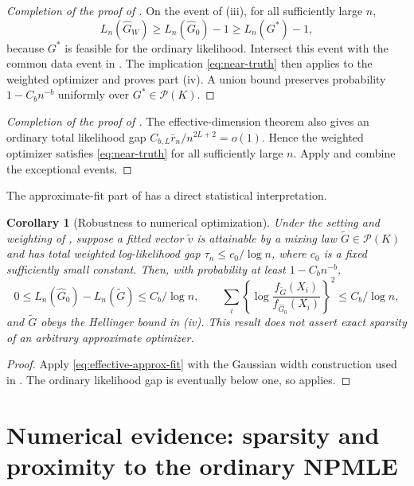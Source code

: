 \documentclass[11pt]{article}
\newtheorem{corollary}[theorem]{Corollary}
\theoremstyle{definition}
\theoremstyle{remark}
\newcommand{\Pcal}{\mathcal P}
\newcommand{\Ghat}{\widehat G}
\newcommand{\Gtil}{\widetilde G}
\newcommand{\vtil}{\widetilde v}
\begin{document}
\begin{proof}[Completion of the proof of ]
On the event of (iii), for all sufficiently large $n$,
\[
 L_n(\Ghat_W)\ge L_n(\Ghat_0)-1\ge L_n(G^*)-1,
\]
because $G^*$ is feasible for the ordinary likelihood.  Intersect this event
with the common data event in .  The implication
\eqref{eq:near-truth} then applies to the weighted optimizer and proves part
(iv).  A union bound preserves probability $1-C_bn^{-b}$ uniformly over
$G^*\in\Pcal(K)$.
\end{proof}

\begin{proof}[Completion of the proof of ]
The effective-dimension theorem also gives an ordinary total likelihood gap
$C_{b,L}\bar r_n/n^{2L+2}=o(1)$.  Hence the weighted optimizer satisfies
\eqref{eq:near-truth} for all sufficiently large $n$.  Apply
 and combine the exceptional events.
\end{proof}

The approximate-fit part of  has a direct statistical
interpretation.

\begin{corollary}[Robustness to numerical optimization]
\label{cor:approx}
Under the setting and weighting of , suppose a fitted vector
$\vtil$ is attainable by a mixing law $\Gtil\in\Pcal(K)$ and has total
weighted log-likelihood gap $\tau_n\le c_0/\log n$, where $c_0$ is a fixed
sufficiently small constant.  Then, with probability at least $1-C_bn^{-b}$,
\[
 0\le L_n(\Ghat_0)-L_n(\Gtil)\le C_b/\log n,
 \qquad
 \sum_i\left\{\log\frac{f_{\Gtil}(X_i)}
 {f_{\Ghat_0}(X_i)}\right\}^2\le C_b/\log n,
\]
and $\Gtil$ obeys the Hellinger bound in (iv).  This result
does not assert exact sparsity of an arbitrary approximate optimizer.
\end{corollary}

\begin{proof}
Apply \eqref{eq:effective-approx-fit} with the Gaussian width construction
used in .  The ordinary likelihood gap is eventually
below one, so  applies.
\end{proof}


\section{Numerical evidence: sparsity and proximity to the ordinary NPMLE}
\label{sec:numerics}
\end{document}
